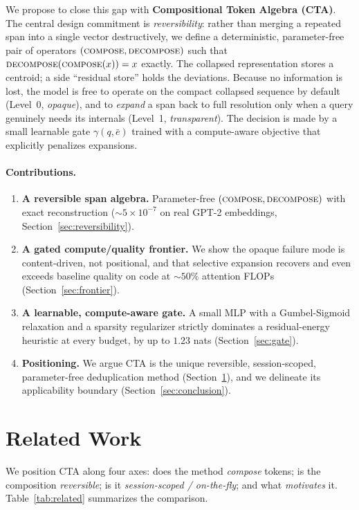 \documentclass[11pt]{article}
\newcommand{\ebar}{\bar{e}}
\newcommand{\compose}{\textsc{compose}}
\newcommand{\decompose}{\textsc{decompose}}
\begin{document}
We propose to close this gap with \textbf{Compositional Token Algebra (CTA)}. The central
design commitment is \emph{reversibility}: rather than merging a repeated span into a
single vector destructively, we define a deterministic, parameter-free pair of operators
$(\compose, \decompose)$ such that $\decompose(\compose(x)) = x$ exactly. The collapsed
representation stores a centroid; a side ``residual store'' holds the deviations. Because
no information is lost, the model is free to operate on the compact collapsed sequence by
default (Level~0, \emph{opaque}), and to \emph{expand} a span back to full resolution only
when a query genuinely needs its internals (Level~1, \emph{transparent}). The decision is
made by a small learnable gate $\gamma(q, \ebar)$ trained with a compute-aware objective
that explicitly penalizes expansions.

\paragraph{Contributions.}
\begin{enumerate}[leftmargin=1.4em,itemsep=1pt]
  \item \textbf{A reversible span algebra.} Parameter-free $(\compose, \decompose)$ with
  exact reconstruction ($\sim\!5\times10^{-7}$ on real GPT-2 embeddings,
  Section~\ref{sec:reversibility}).
  \item \textbf{A gated compute/quality frontier.} We show the opaque failure mode is
  content-driven, not positional, and that selective expansion recovers and even exceeds
  baseline quality on code at $\sim\!50\%$ attention FLOPs (Section~\ref{sec:frontier}).
  \item \textbf{A learnable, compute-aware gate.} A small MLP with a Gumbel-Sigmoid
  relaxation and a sparsity regularizer strictly dominates a residual-energy heuristic at
  every budget, by up to $1.23$ nats (Section~\ref{sec:gate}).
  \item \textbf{Positioning.} We argue CTA is the unique reversible, session-scoped,
  parameter-free deduplication method (Section~\ref{sec:related}), and we delineate its
  applicability boundary (Section~\ref{sec:conclusion}).
\end{enumerate}

\section{Related Work}
\label{sec:related}

We position CTA along four axes: does the method \emph{compose} tokens; is the composition
\emph{reversible}; is it \emph{session-scoped / on-the-fly}; and what \emph{motivates} it.
Table~\ref{tab:related} summarizes the comparison.
\end{document}
